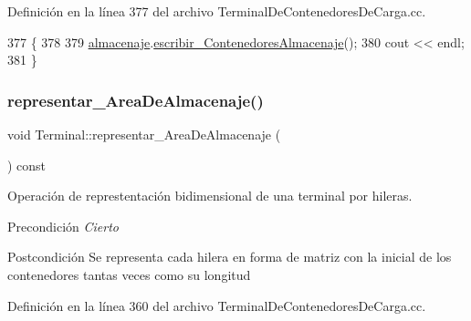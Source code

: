 Definición en la línea 377 del archivo Terminal\+De\+Contenedores\+De\+Carga.\+cc.


\begin{DoxyCode}
377                                                      \{
378     
379     \hyperlink{class_terminal_a1d87d7b16c4f460eee6f1ab73da90fd2}{almacenaje}.\hyperlink{class_almacenaje_a5de7fa3a41e402feecac670c226a058f}{escribir\_ContenedoresAlmacenaje}();
380     cout << endl;
381 \}
\end{DoxyCode}
\mbox{\label{class_terminal_a32d375e8cecdafbbf0a291f646456dd6}} 
\subsubsection{\texorpdfstring{representar\+\_\+\+Area\+De\+Almacenaje()}{representar\_AreaDeAlmacenaje()}}
{\footnotesize\ttfamily void Terminal\+::representar\+\_\+\+Area\+De\+Almacenaje (\begin{DoxyParamCaption}{ }\end{DoxyParamCaption}) const}



Operación de represtentación bidimensional de una terminal por hileras. 

\begin{DoxyPrecond}{Precondición}
{\itshape Cierto} 
\end{DoxyPrecond}
\begin{DoxyPostcond}{Postcondición}
Se representa cada hilera en forma de matriz con la inicial de los contenedores tantas veces como su longitud 
\end{DoxyPostcond}


Definición en la línea 360 del archivo Terminal\+De\+Contenedores\+De\+Carga.\+cc.



